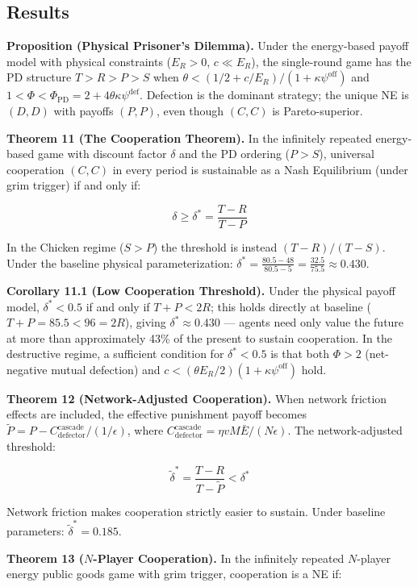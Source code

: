 \documentclass[11pt]{article}
\begin{document}
\subsection{Results}\label{results}

\textbf{Proposition (Physical Prisoner's Dilemma).} Under the
energy-based payoff model with physical constraints (\(E_R > 0\),
\(c \ll E_R\)), the single-round game has the PD structure
\(T > R > P > S\) when
\(\theta < (1/2 + c/E_R)/(1 + \kappa\psi^{\text{off}})\) and
\(1 < \Phi < \Phi_{\text{PD}} = 2 + 4\theta\kappa\psi^{\text{def}}\).
Defection is the dominant strategy; the unique NE is \((D,D)\) with
payoffs \((P,P)\), even though \((C,C)\) is Pareto-superior.

\textbf{Theorem 11 (The Cooperation Theorem).} In the infinitely
repeated energy-based game with discount factor \(\delta\) and the PD
ordering (\(P > S\)), universal cooperation \((C,C)\) in every period is
sustainable as a Nash Equilibrium (under grim trigger) if and only if:

\[\delta \geq \delta^* = \frac{T - R}{T - P}\]

In the Chicken regime (\(S > P\)) the threshold is instead
\((T-R)/(T-S)\). Under the baseline physical parameterization:
\(\delta^* = \frac{80.5 - 48}{80.5 - 5} = \frac{32.5}{75.5} \approx 0.430\).

\textbf{Corollary 11.1 (Low Cooperation Threshold).} Under the physical
payoff model, \(\delta^* < 0.5\) if and only if \(T + P < 2R\); this
holds directly at baseline (\(T + P = 85.5 < 96 = 2R\)), giving
\(\delta^* \approx 0.430\) --- agents need only value the future at more
than approximately 43\% of the present to sustain cooperation. In the
destructive regime, a sufficient condition for \(\delta^* < 0.5\) is
that both \(\Phi > 2\) (net-negative mutual defection) and
\(c < (\theta E_R/2)(1 + \kappa\psi^{\text{off}})\) hold.

\textbf{Theorem 12 (Network-Adjusted Cooperation).} When network
friction effects are included, the effective punishment payoff becomes
\(\tilde{P} = P - C_{\text{defector}}^{\text{cascade}} / (1/\epsilon)\),
where
\(C_{\text{defector}}^{\text{cascade}} = \eta v M \bar{E} / (N\epsilon)\).
The network-adjusted threshold:

\[\tilde{\delta}^* = \frac{T - R}{T - \tilde{P}} < \delta^*\]

Network friction makes cooperation strictly easier to sustain. Under
baseline parameters: \(\tilde{\delta}^* = 0.185\).

\textbf{Theorem 13 (\(N\)-Player Cooperation).} In the infinitely
repeated \(N\)-player energy public goods game with grim trigger,
cooperation is a NE if:
\end{document}

